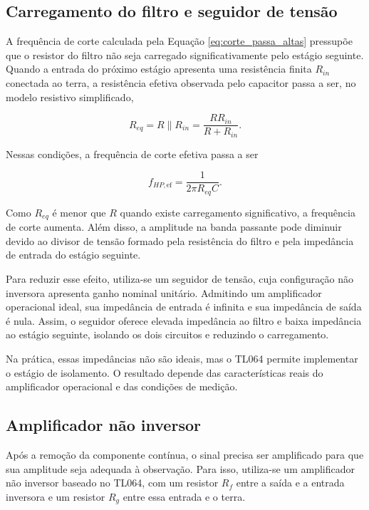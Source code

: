 \documentclass[11pt,a4paper]{article}
\begin{document}
\subsection{Carregamento do filtro e seguidor de tensão}
\label{sec:carregamento-seguidor}

A frequência de corte calculada pela Equação \ref{eq:corte_passa_altas} pressupõe que o resistor do filtro não seja carregado significativamente pelo estágio seguinte. Quando a entrada do próximo estágio apresenta uma resistência finita $R_{in}$ conectada ao terra, a resistência efetiva observada pelo capacitor passa a ser, no modelo resistivo simplificado,

\begin{equation}
R_{eq}=R\parallel R_{in}
=\frac{RR_{in}}{R+R_{in}}.
\label{eq:resistencia_equivalente_hp}
\end{equation}

Nessas condições, a frequência de corte efetiva passa a ser

\begin{equation}
f_{HP,\mathrm{ef}}
=
\frac{1}{2\pi R_{eq}C}.
\label{eq:corte_efetivo_hp}
\end{equation}

Como $R_{eq}$ é menor que $R$ quando existe carregamento significativo, a frequência de corte aumenta. Além disso, a amplitude na banda passante pode diminuir devido ao divisor de tensão formado pela resistência do filtro e pela impedância de entrada do estágio seguinte.

Para reduzir esse efeito, utiliza-se um seguidor de tensão, cuja configuração não inversora apresenta ganho nominal unitário. Admitindo um amplificador operacional ideal, sua impedância de entrada é infinita e sua impedância de saída é nula. Assim, o seguidor oferece elevada impedância ao filtro e baixa impedância ao estágio seguinte, isolando os dois circuitos e reduzindo o carregamento.

Na prática, essas impedâncias não são ideais, mas o TL064 permite implementar o estágio de isolamento. O resultado depende das características reais do amplificador operacional e das condições de medição.

\subsection{Amplificador não inversor}

Após a remoção da componente contínua, o sinal precisa ser amplificado para que sua amplitude seja adequada à observação. Para isso, utiliza-se um amplificador não inversor baseado no TL064, com um resistor $R_f$ entre a saída e a entrada inversora e um resistor $R_g$ entre essa entrada e o terra.
\end{document}
